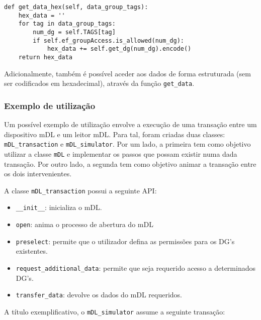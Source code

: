 \begin{Verbatim}[frame=single, framerule=0.5mm]
def get_data_hex(self, data_group_tags):
	hex_data = ''
	for tag in data_group_tags:
		num_dg = self.TAGS[tag]
		if self.ef_groupAccess.is_allowed(num_dg):
			hex_data += self.get_dg(num_dg).encode()
	return hex_data
\end{Verbatim}

Adicionalmente, também é possível aceder aos dados de forma estruturada (sem ser codificados em hexadecimal), através da função \texttt{get\_data}.


\subsubsection{Exemplo de utilização}

Um possível exemplo de utilização envolve a execução de uma transação entre um dispositivo mDL e um leitor mDL\@. Para tal, foram criadas duas classes: \texttt{mDL\_transaction} e \texttt{mDL\_simulator}. Por um lado, a primeira tem como objetivo utilizar a classe \texttt{mDL} e implementar os passos que possam existir numa dada transação. Por outro lado, a segunda tem como objetivo animar a transação entre os dois intervenientes.

A classe \texttt{mDL\_transaction} possui a seguinte API:

\begin{itemize}
	\item \texttt{\_\_init\_\_}: inicializa o mDL.
	\item \texttt{open}: anima o processo de abertura do mDL
	\item \texttt{preselect}: permite que o utilizador defina as permissões para os DG's existentes.
	\item \texttt{request\_additional\_data}: permite que seja requerido acesso a determinados DG's.
	\item \texttt{transfer\_data}: devolve os dados do mDL requeridos.
\end{itemize}

A título exemplificativo, o \texttt{mDL\_simulator} assume a seguinte transação:


